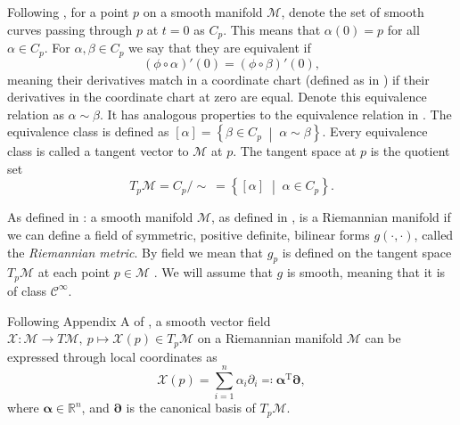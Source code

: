 \begin{definition}\label{def:tangent_space}
    Following \cite[Def.~8.33]{Boumal2023}, for a point $p$ on a smooth manifold $\mathcal{M}$, denote the set of smooth curves \cite[Def.~8.5]{Boumal2023} passing through $p$ at $t=0$ as $C_{p}$. This means that $\alpha(0)=p$ for all $\alpha\in C_{p}$. For $\alpha, \beta\in C_{p}$ we say that they are equivalent if 
    \begin{equation*}
        (\phi\circ \alpha)'(0)=(\phi\circ \beta)'(0),
    \end{equation*}
    meaning their derivatives match in a \textup{coordinate chart} (defined as in \cite[p.~4]{Lee2012:1}) if their derivatives in the coordinate chart at zero are equal. Denote this equivalence relation as $\alpha\sim \beta$. It has analogous properties to the equivalence relation in . The equivalence class is defined as $[\alpha]=\left\{\beta\in C_{p} \;\middle|\; \alpha\sim \beta\right\}$. Every equivalence class is called a \textup{tangent vector} to $\mathcal{M}$ at $p$. The \textup{tangent space} at $p$ is the quotient set
    \begin{equation*}
        T_{p}\mathcal{M}=C_{p}/\sim~=\left\{[\alpha] \;\middle|\; \alpha\in C_{p}\right\}.
    \end{equation*}  
\end{definition}

\begin{definition}\label{def:riemannian_manifold}
    As defined in \cite[def~2.6,~p.~179]{Boothby1975}: a \textup{smooth manifold} $\mathcal{M}$, as defined in \cite[p.~13]{Lee2012:1},  is a \textup{Riemannian manifold} if we can define a field of symmetric, positive definite, bilinear forms $g(\cdot,\cdot)$, called the \textit{Riemannian metric}. By field we mean that $g_p$ is defined on the tangent space $T_p\mathcal{M}$ at each point $p\in \mathcal{M}$ \cite[def~2.1,~p.~178]{Boothby1975}. We will assume that $g$ is smooth, meaning that it is of class $\mathcal{C}^\infty$.
\end{definition}


\begin{definition}\label{def:vector_field_on_manifold}
    Following Appendix A of \cite{JensenZimmermann2024}, a smooth vector field $\mathcal{X}:\mathcal{M}\xrightarrow{}T \mathcal{M},~p\mapsto \mathcal{X}(p)\in T_{p}\mathcal{M}$ on a Riemannian manifold $\mathcal{M}$ can be expressed through local coordinates as 
    \begin{equation*}
        \mathcal{X}(p)=\sum\limits_{i=1}^{n}\alpha_{i}\partial_{i}\eqqcolon \mathbf{\alpha}^{\mathrm{T}}\mathbf{\partial},
    \end{equation*}
    where $\mathbf{\alpha}\in \mathbb{R}^{n}$, and $\mathbf{\partial}$ is the canonical basis of $T_{p}\mathcal{M}$.
    
\end{definition}

